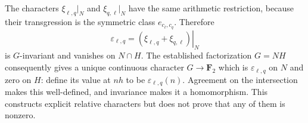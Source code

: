 \begin{remark}
The characters \(\xi_{\ell,q}|_N\) and
\(\xi_{q,\ell}|_N\) have the same arithmetic restriction,
because their transgression is the symmetric class
\(e_{c_\ell,c_q}\).
Therefore
\[
          \varepsilon_{\ell,q}
             =\left.(\xi_{\ell,q}+\xi_{q,\ell})\right|_N
\]
is \(G\)-invariant and vanishes on \(N\cap H\).
The established factorization \(G=NH\) consequently
gives a unique continuous character \(G\to\mathbf F_2\)
which is \(\varepsilon_{\ell,q}\) on \(N\) and zero on
\(H\): define its value at \(nh\) to be
\(\varepsilon_{\ell,q}(n)\).
Agreement on the intersection makes this well-defined,
and invariance makes it a homomorphism.
This constructs explicit relative characters but does
not prove that any of them is nonzero.
\end{remark}
